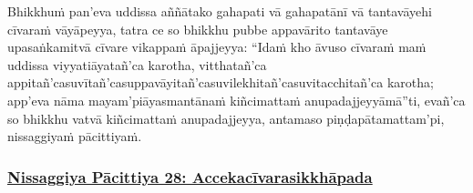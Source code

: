 {
Bhikkhuṁ pan'eva uddissa aññātako gahapati vā gahapatānī vā tantavāyehi cīvaraṁ vāyāpeyya, tatra ce so bhikkhu pubbe appavārito tantavāye upasaṅkamitvā cīvare vikappaṁ āpajjeyya: ``Idaṁ kho āvuso cīvaraṁ maṁ uddissa viyyati\makeatletter\hyperlink{endnote209-appendix}\makeatother \thinspace āyatañ'ca karotha, vitthatañ'ca appitañ'ca\makeatletter\hyperlink{endnote210-appendix}\makeatother \thinspace suvītañ'ca\makeatletter\hyperlink{endnote211-appendix}\makeatother \thinspace suppavāyitañ'ca\makeatletter\hyperlink{endnote212-appendix}\makeatother \thinspace suvilekhitañ'ca\makeatletter\hyperlink{endnote213-appendix}\makeatother \thinspace suvitacchitañ'ca karotha; app'eva nāma mayam'pi\makeatletter\hyperlink{endnote214-appendix}\makeatother \thinspace āyasmantānaṁ kiñcimattaṁ anupadajjeyyāmā''ti, evañ'ca so bhikkhu vatvā kiñcimattaṁ anupadajjeyya, antamaso piṇḍapātamattam'pi, nissaggiyaṁ pācittiyaṁ.



\subsubsection*{\hyperref[forf-exp28]{Nissaggiya Pācittiya 28: Accekacīvarasikkhāpada}}
\label{np28}

}
